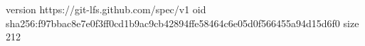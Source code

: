 version https://git-lfs.github.com/spec/v1
oid sha256:f97bbac8e7e0f3ff0cd1b9ac9cb42894ffe58464c6e05d0f566455a94d15d6f0
size 212
